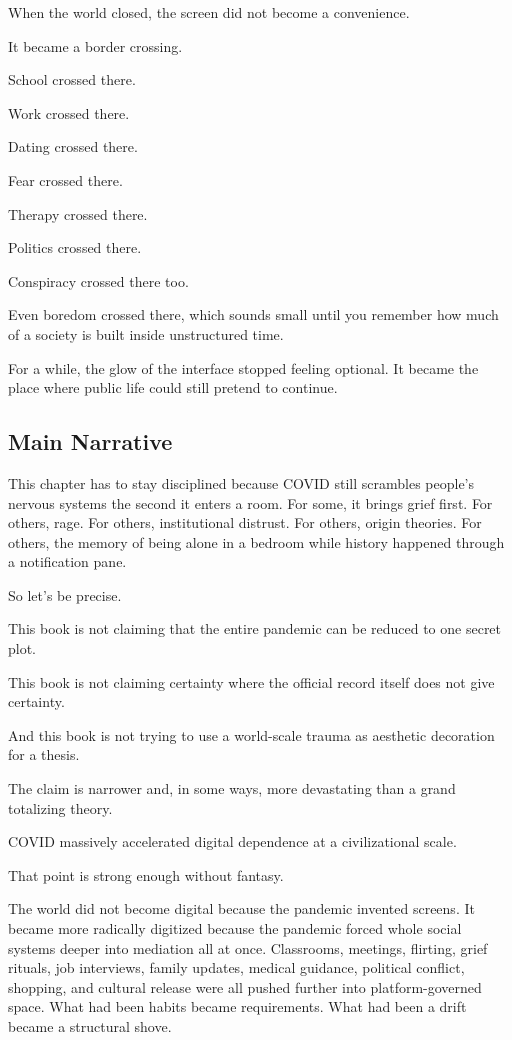 \documentclass[
  american,
  12pt,
  letterpaper,
]{article}
\begin{document}
When the world closed, the screen did not become a convenience.

It became a border crossing.

School crossed there.

Work crossed there.

Dating crossed there.

Fear crossed there.

Therapy crossed there.

Politics crossed there.

Conspiracy crossed there too.

Even boredom crossed there, which sounds small until you remember how
much of a society is built inside unstructured time.

For a while, the glow of the interface stopped feeling optional. It
became the place where public life could still pretend to continue.

\subsection{Main Narrative}\label{main-narrative-3}

This chapter has to stay disciplined because COVID still scrambles
people's nervous systems the second it enters a room. For some, it
brings grief first. For others, rage. For others, institutional
distrust. For others, origin theories. For others, the memory of being
alone in a bedroom while history happened through a notification pane.

So let's be precise.

This book is not claiming that the entire pandemic can be reduced to one
secret plot.

This book is not claiming certainty where the official record itself
does not give certainty.

And this book is not trying to use a world-scale trauma as aesthetic
decoration for a thesis.

The claim is narrower and, in some ways, more devastating than a grand
totalizing theory.

COVID massively accelerated digital dependence at a civilizational
scale.

That point is strong enough without fantasy.

The world did not become digital because the pandemic invented screens.
It became more radically digitized because the pandemic forced whole
social systems deeper into mediation all at once. Classrooms, meetings,
flirting, grief rituals, job interviews, family updates, medical
guidance, political conflict, shopping, and cultural release were all
pushed further into platform-governed space. What had been habits became
requirements. What had been a drift became a structural shove.
\end{document}
